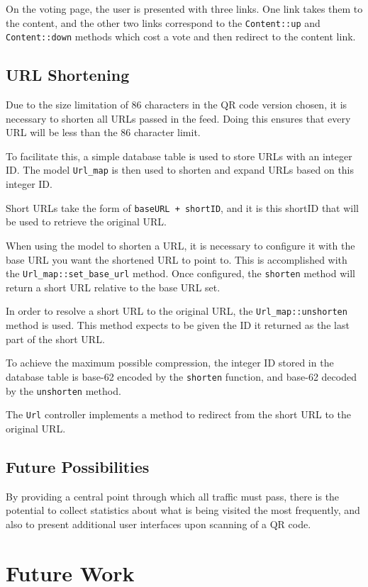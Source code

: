\documentclass[11pt]{article}
\begin{document}
On the voting page, the user is presented with three links. One link takes them to the content, and the other two links correspond to the \texttt{Content::up} and \texttt{Content::down} methods which cost a vote and then redirect to the content link.

\subsection{URL Shortening}
Due to the size limitation of 86 characters in the QR code version chosen, it is necessary to shorten all URLs passed in the feed. Doing this ensures that every URL will be less than the 86 character limit.

To facilitate this, a simple database table is used to store URLs with an integer ID. The model \texttt{Url\_map} is then used to shorten and expand URLs based on this integer ID.

Short URLs take the form of \texttt{baseURL + shortID}, and it is this shortID that will be used to retrieve the original URL.

When using the model to shorten a URL, it is necessary to configure it with the base URL you want the shortened URL to point to. This is accomplished with the \texttt{Url\_map::set\_base\_url} method. Once configured, the \texttt{shorten} method will return a short URL relative to the base URL set.

In order to resolve a short URL to the original URL, the \texttt{Url\_map::unshorten} method is used. This method expects to be given the ID it returned as the last part of the short URL.

To achieve the maximum possible compression, the integer ID stored in the database table is base-62 encoded by the \texttt{shorten} function, and base-62 decoded by the \texttt{unshorten} method.

The \texttt{Url} controller implements a method to redirect from the short URL to the original URL.

\subsection{Future Possibilities}
By providing a central point through which all traffic must pass, there is the potential to collect statistics about what is being visited the most frequently, and also to present additional user interfaces upon scanning of a QR code.

\section{Future Work}
\end{document}
